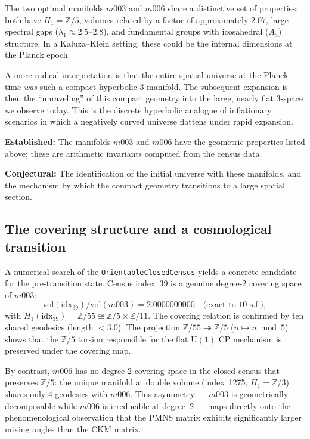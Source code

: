 ﻿\documentclass[12pt]{article}
\theoremstyle{definition}
\begin{document}
The two optimal manifolds $m003$ and $m006$ share a distinctive set
of properties: both have $H_1 = \mathbb{Z}/5$, volumes related by
a factor of approximately $2.07$, large spectral gaps
($\lambda_1 \approx 2.5$--$2.8$), and fundamental groups with
icosahedral ($A_5$) structure. In a Kaluza--Klein setting, these
could be the internal dimensions at the Planck epoch.

A more radical interpretation is that the entire spatial universe at
the Planck time \emph{was} such a compact hyperbolic 3-manifold. The
subsequent expansion is then the ``unraveling'' of this compact
geometry into the large, nearly flat 3-space we observe today. This
is the discrete hyperbolic analogue of inflationary scenarios in which
a negatively curved universe flattens under rapid expansion.

\textbf{Established:} The manifolds $m003$ and $m006$ have the
geometric properties listed above; these are arithmetic invariants
computed from the census data.

\textbf{Conjectural:} The identification of the initial universe with
these manifolds, and the mechanism by which the compact geometry
transitions to a large spatial section.

\subsection{The covering structure and a cosmological transition}
\label{sec:cover_cosm}

A numerical search of the \texttt{OrientableClosedCensus} yields
a concrete candidate for the pre-transition state. Census index~39
is a genuine degree-2 covering space of $m003$:
\[
  \mathrm{vol}(\text{idx}_{39}) / \mathrm{vol}(m003)
  = 2.0000000000 \quad \text{(exact to 10 s.f.)},
\]
with $H_1(\text{idx}_{39}) = \mathbb{Z}/55 \cong \mathbb{Z}/5
\times \mathbb{Z}/11$. The covering relation is confirmed by ten
shared geodesics (length $< 3.0$). The projection
$\mathbb{Z}/55 \twoheadrightarrow \mathbb{Z}/5$ ($n \mapsto n
\bmod 5$) shows that the $\mathbb{Z}/5$ torsion responsible for the
flat $\mathrm{U}(1)$ CP mechanism is preserved under the covering map.

By contrast, $m006$ has no degree-2 covering space in the closed
census that preserves $\mathbb{Z}/5$: the unique manifold at double
volume (index~1275, $H_1 = \mathbb{Z}/3$) shares only 4 geodesics with $m006$. This asymmetry --- $m003$ is geometrically
decomposable while $m006$ is irreducible at degree~2 --- maps
directly onto the phenomenological observation that the PMNS matrix
exhibits significantly larger mixing angles than the CKM matrix.
\end{document}
